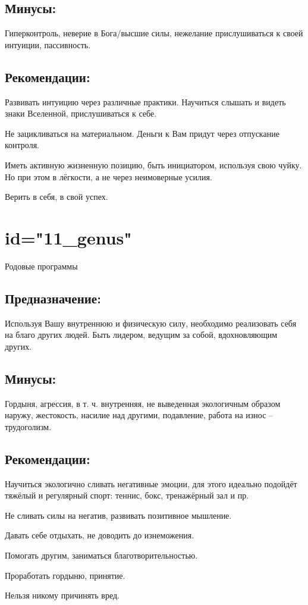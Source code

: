 \subsection{Минусы:}
Гиперконтроль, неверие в Бога/высшие силы, нежелание прислушиваться 
к своей интуиции, пассивность.
\endsubsection

\subsection{Рекомендации:}
\item Развивать интуицию через различные практики. Научиться слышать 
и видеть знаки Вселенной, прислушиваться к себе.
\item Не зацикливаться на материальном. Деньги к Вам придут через 
отпускание контроля.
\item Иметь активную жизненную позицию, быть инициатором, используя 
свою чуйку. Но при этом в лёгкости, а не через неимоверные усилия.
\item Верить в себя, в свой успех.
\endsubsection

\endsection

\section{id="11_genus"}{Родовые программы}

\subsection{Предназначение:}
Используя Вашу внутреннюю и физическую силу, необходимо реализовать 
себя на благо других людей. Быть лидером, ведущим за собой, 
вдохновляющим других.
\endsubsection

\subsection{Минусы:}
Гордыня, агрессия, в т. ч. внутренняя, не выведенная экологичным 
образом наружу, жестокость, насилие над другими, подавление, 
работа на износ – трудоголизм.
\endsubsection

\subsection{Рекомендации:}
\item Научиться экологично сливать негативные эмоции, для этого 
идеально подойдёт тяжёлый и регулярный спорт: теннис, бокс, 
тренажёрный зал и пр.
\item Не сливать силы на негатив, развивать позитивное мышление.
\item Давать себе отдыхать, не доводить до изнеможения.
\item Помогать другим, заниматься благотворительностью.
\item Проработать гордыню, принятие.
\item Нельзя никому причинять вред.
\endsubsection

